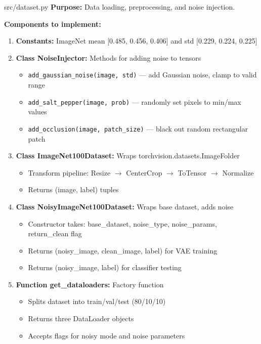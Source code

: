 \documentclass[11pt,a4paper]{article}
\begin{document}
\vspace{0.5cm}

\begin{filebox}{src/dataset.py}
\textbf{Purpose:} Data loading, preprocessing, and noise injection.

\textbf{Components to implement:}
\begin{enumerate}[noitemsep]
    \item \textbf{Constants:} ImageNet mean [0.485, 0.456, 0.406] and std [0.229, 0.224, 0.225]
    \item \textbf{Class NoiseInjector:} Methods for adding noise to tensors
    \begin{itemize}[noitemsep]
        \item \texttt{add\_gaussian\_noise(image, std)} --- add Gaussian noise, clamp to valid range
        \item \texttt{add\_salt\_pepper(image, prob)} --- randomly set pixels to min/max values
        \item \texttt{add\_occlusion(image, patch\_size)} --- black out random rectangular patch
    \end{itemize}
    \item \textbf{Class ImageNet100Dataset:} Wraps torchvision.datasets.ImageFolder
    \begin{itemize}[noitemsep]
        \item Transform pipeline: Resize $\rightarrow$ CenterCrop $\rightarrow$ ToTensor $\rightarrow$ Normalize
        \item Returns (image, label) tuples
    \end{itemize}
    \item \textbf{Class NoisyImageNet100Dataset:} Wraps base dataset, adds noise
    \begin{itemize}[noitemsep]
        \item Constructor takes: base\_dataset, noise\_type, noise\_params, return\_clean flag
        \item Returns (noisy\_image, clean\_image, label) for VAE training
        \item Returns (noisy\_image, label) for classifier testing
    \end{itemize}
    \item \textbf{Function get\_dataloaders:} Factory function
    \begin{itemize}[noitemsep]
        \item Splits dataset into train/val/test (80/10/10)
        \item Returns three DataLoader objects
        \item Accepts flags for noisy mode and noise parameters
    \end{itemize}
\end{enumerate}
\end{filebox}
\end{document}

